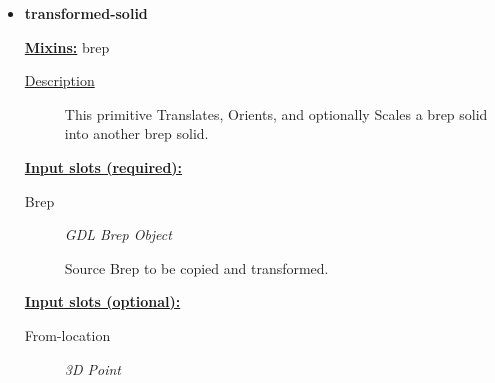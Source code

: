 \documentclass [11pt]{book}
\begin{document}
\begin{itemize}







\item {}
\label{prim:transformed-solid}
\textbf{transformed-solid}


\textbf{
\underline{Mixins:}} brep





\begin{description}

\item [
\underline{Description}]


This primitive Translates, Orients, and optionally Scales a brep solid into another brep solid.



\end{description}








\textbf{
\underline{Input slots (required):}}

\begin{description}

\item [Brep]
\emph{GDL Brep Object}

 Source Brep to be copied and transformed.




\end{description}






\textbf{
\underline{Input slots (optional):}}

\begin{description}

\item [From-location]
\emph{3D Point}


\end{description}
\end{itemize}
\end{document}

